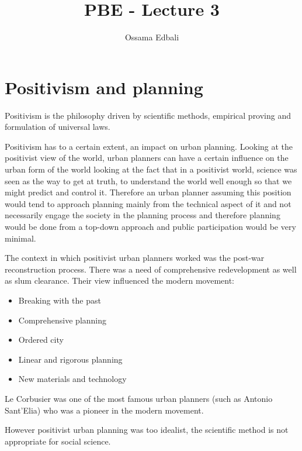 \documentclass{article}
\title{PBE - Lecture 3}
\author{Ossama Edbali}
\begin{document}
	
	\maketitle
	
	\section{Positivism and planning}	
	Positivism is the philosophy driven by scientific methods, empirical proving and formulation
	of universal laws.	
	
	Positivism has to a certain extent, an impact on urban planning.
	Looking at the positivist view of the world, urban planners can have a certain influence on the urban form
	of the world looking at the fact that in a positivist world, science was seen as the way to get at truth, to
	understand the world well enough so that we might predict and control it. Therefore an urban planner
	assuming this position would tend to approach planning mainly from the technical aspect of it and not
	necessarily engage the society in the planning process and therefore planning would be done from a top-down
	approach and public participation would be very minimal.
	
	The context in which positivist urban planners worked was the post-war reconstruction process.
	There was a need of comprehensive redevelopment as well as slum clearance. Their view influenced the
	modern movement:
	\begin{itemize}
		\item Breaking with the past
		\item Comprehensive planning
		\item Ordered city
		\item Linear and rigorous planning
		\item New materials and technology
	\end{itemize}
	
	Le Corbusier was one of the most famous urban planners (such as Antonio Sant'Elia)
	who was a pioneer in the modern movement.
	
	However positivist urban planning was too idealist, the scientific method is not appropriate for
	social science.
	
\end{document}
